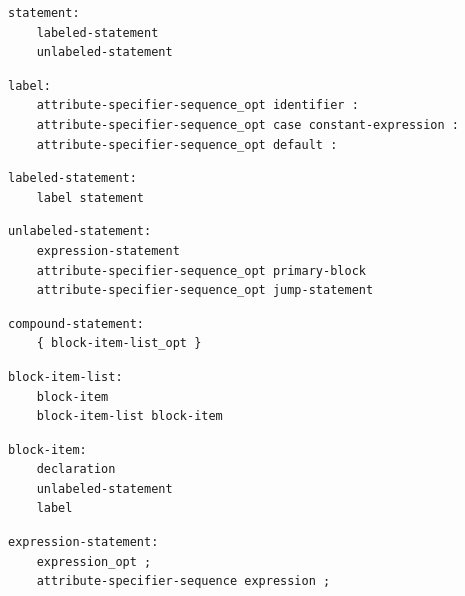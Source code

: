 \noindent\textbf{\texttt{}}\par
\begin{lstlisting}
statement:
    labeled-statement
    unlabeled-statement
\end{lstlisting}

\noindent\textbf{\texttt{}}\par
\begin{lstlisting}
label:
    attribute-specifier-sequence_opt identifier :
    attribute-specifier-sequence_opt case constant-expression :
    attribute-specifier-sequence_opt default :
\end{lstlisting}

\noindent\textbf{\texttt{}}\par
\begin{lstlisting}
labeled-statement:
    label statement
\end{lstlisting}

\noindent\textbf{\texttt{}}\par
\begin{lstlisting}
unlabeled-statement:
    expression-statement
    attribute-specifier-sequence_opt primary-block
    attribute-specifier-sequence_opt jump-statement
\end{lstlisting}

\noindent\textbf{\texttt{}}\par
\begin{lstlisting}
compound-statement:
    { block-item-list_opt }
\end{lstlisting}

\noindent\textbf{\texttt{}}\par
\begin{lstlisting}
block-item-list:
    block-item
    block-item-list block-item
\end{lstlisting}

\noindent\textbf{\texttt{}}\par
\begin{lstlisting}
block-item:
    declaration
    unlabeled-statement
    label
\end{lstlisting}

\noindent\textbf{\texttt{}}\par
\begin{lstlisting}
expression-statement:
    expression_opt ;
    attribute-specifier-sequence expression ;
\end{lstlisting}


